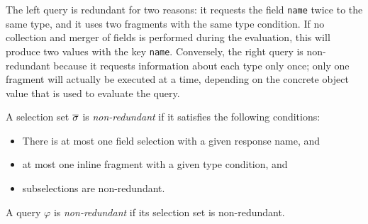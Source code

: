 The left query is redundant for two reasons: it requests the field \texttt{name} twice to the same type, and it uses two fragments with the same type condition. If no collection and merger of fields is performed during the evaluation, this will produce two values with the key \texttt{name}. 
Conversely, the right query is non-redundant because it requests information about each type only once; only one fragment will actually be executed at a time, depending on the concrete object value that is used to evaluate the query.

\begin{definition}
A \gql selection set $\overline{\sigma}$ is \textit{non-redundant} if it satisfies the following conditions:
\begin{itemize}
    \item There is at most one field selection with a given response name, and
    
    \item at most one inline fragment with a given type condition, and
    
    \item subselections are non-redundant.
\end{itemize}
\end{definition}

\begin{definition}
A \gql query $\varphi$ is \textit{non-redundant} if its selection set is non-redundant.
\end{definition}



